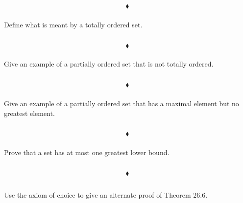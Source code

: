 $$\blacklozenge$$

\subsubsection{}
\begin{tcolorbox}
Define what is meant by a totally ordered set.
\end{tcolorbox}
$$ $$

$$\blacklozenge$$

\subsubsection{}
\begin{tcolorbox}
Give an example of a partially ordered set that is not totally ordered.  
\end{tcolorbox}
$$ $$

$$\blacklozenge$$

\subsubsection{}
\begin{tcolorbox}
Give an example of a partially ordered set that has a maximal element but no greatest element. 
\end{tcolorbox}
$$ $$

$$\blacklozenge$$

\subsubsection{}
\begin{tcolorbox}
Prove that a set has at most one greatest lower bound. 
\end{tcolorbox}
$$ $$

$$\blacklozenge$$



\renewcommand{\thesubsection}{\thesection.\RomanNumeralCaps{11}}
\subsection{}
\subsubsection{}
\begin{tcolorbox}
Use the axiom of choice to give an alternate proof of Theorem $\mathbf{26.6}$. 

\end{tcolorbox}
$$ $$

